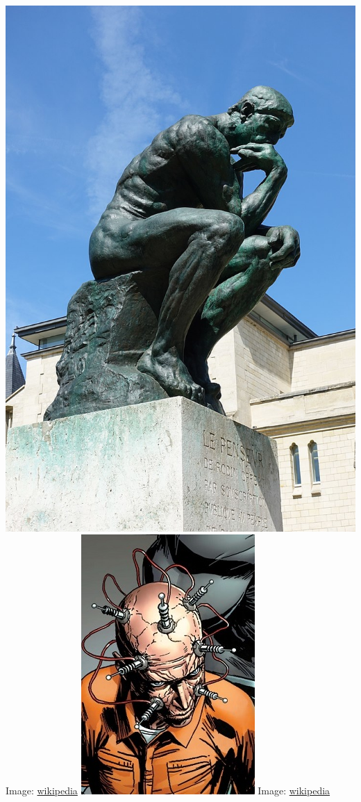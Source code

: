\documentclass[fleqn]{beamer} %
\begin{document}
\begin{frame}[label=sectionIV]
\begin{multicols}{2}
			\includegraphics[scale=.071]{thinker_rodin.png}
			{\tiny Image: \href{https://en.wikipedia.org/wiki/The_Thinker}{wikipedia}}
			\includegraphics[scale=.15]{thinker_dc_comics.png}
			{\tiny Image: \href{https://en.wikipedia.org/wiki/Thinker_(DC_Comics)}{wikipedia}}
		\end{multicols}	

	\end{frame}
\end{document}
